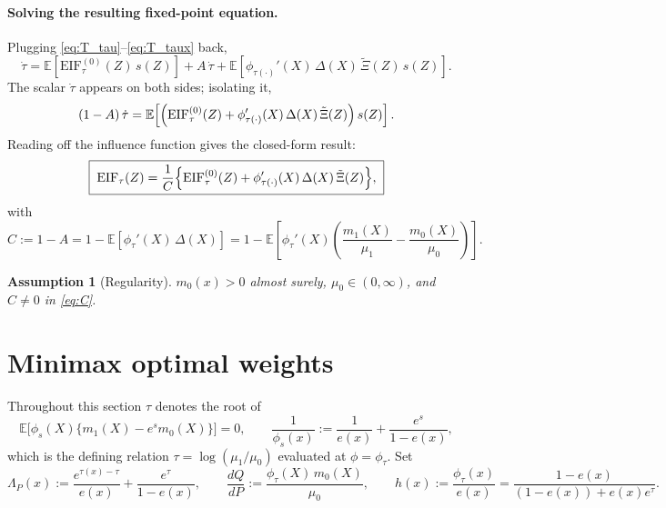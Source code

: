 \documentclass{article}
\newtheorem{assumption}{Assumption}
\begin{document}
\paragraph{Solving the resulting fixed-point equation.}
Plugging \eqref{eq:T_tau}--\eqref{eq:T_taux} back,
\[
  \dot\tau
  = \mathbb{E}\!\left[\mathrm{EIF}^{(0)}_\tau(Z)\,s(Z)\right]
    + A\,\dot\tau
    + \mathbb{E}\!\left[\phi_{\tau(\cdot)}'(X)\,\Delta(X)\,\tilde\Xi(Z)\,s(Z)\right].
\]
The scalar $\dot\tau$ appears on both sides; isolating it,
\[
  (1 - A)\,\dot\tau
  = \mathbb{E}\!\left[\Bigl(\mathrm{EIF}^{(0)}_\tau(Z) + \phi_{\tau(\cdot)}'(X)\,\Delta(X)\,\tilde\Xi(Z)\Bigr)\,s(Z)\right].
\]
Reading off the influence function gives the closed-form result:
\begin{equation}
  \label{eq:eif_full}
  \boxed{\;
  \mathrm{EIF}_\tau(Z)
  = \frac{1}{C}\Bigl\{\mathrm{EIF}^{(0)}_\tau(Z) + \phi_{\tau(\cdot)}'(X)\,\Delta(X)\,\tilde\Xi(Z)\Bigr\},\;}
\end{equation}
with
\begin{equation}
  \label{eq:C}
  C := 1 - A
     = 1 - \mathbb{E}\!\left[\phi_\tau'(X)\,\Delta(X)\right]
     = 1 - \mathbb{E}\!\left[\phi_\tau'(X)\!\left(\frac{m_1(X)}{\mu_1}-\frac{m_0(X)}{\mu_0}\right)\right].
\end{equation}

\begin{assumption}[Regularity]
$m_0(x)>0$ almost surely, $\mu_0\in(0,\infty)$, and $C\neq 0$ in \eqref{eq:C}.
\end{assumption}

\section*{Minimax optimal weights}

Throughout this section $\tau$ denotes the root of
\begin{equation}
  \label{eq:pseudotrue}
  \mathbb{E}\bigl[\phi_s(X)\{m_1(X)-e^{s}m_0(X)\}\bigr]=0,
  \qquad
  \frac{1}{\phi_s(x)}:=\frac{1}{e(x)}+\frac{e^{s}}{1-e(x)},
\end{equation}
which is the defining relation $\tau=\log(\mu_1/\mu_0)$ evaluated at $\phi=\phi_\tau$.  Set
\begin{equation}
  \label{eq:LambdaQh}
  \Lambda_P(x):=\frac{e^{\tau(x)-\tau}}{e(x)}+\frac{e^{\tau}}{1-e(x)},
  \qquad
  \frac{dQ}{dP}:=\frac{\phi_\tau(X)\,m_0(X)}{\mu_0},
  \qquad
  h(x):=\frac{\phi_\tau(x)}{e(x)}=\frac{1-e(x)}{(1-e(x))+e(x)e^{\tau}} .
\end{equation}
\end{document}
